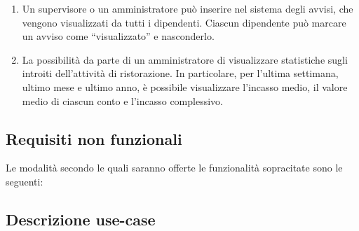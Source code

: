 \begin{enumerate}
    \item Un supervisore o un amministratore può inserire nel sistema degli avvisi, che vengono
          visualizzati da tutti i dipendenti. Ciascun dipendente può marcare un avviso come “visualizzato”
          e nasconderlo.

    \item La possibilità da parte di un amministratore di visualizzare statistiche sugli introiti dell’attività di ristorazione. In particolare, per l'ultima settimana, ultimo mese e ultimo anno, è possibile visualizzare l’incasso
          medio, il valore medio di ciascun conto e l’incasso complessivo.
\end{enumerate}

\subsection{Requisiti non funzionali}
Le modalità secondo le quali saranno offerte le funzionalità sopracitate sono le seguenti:
\subsection{Descrizione use-case}

